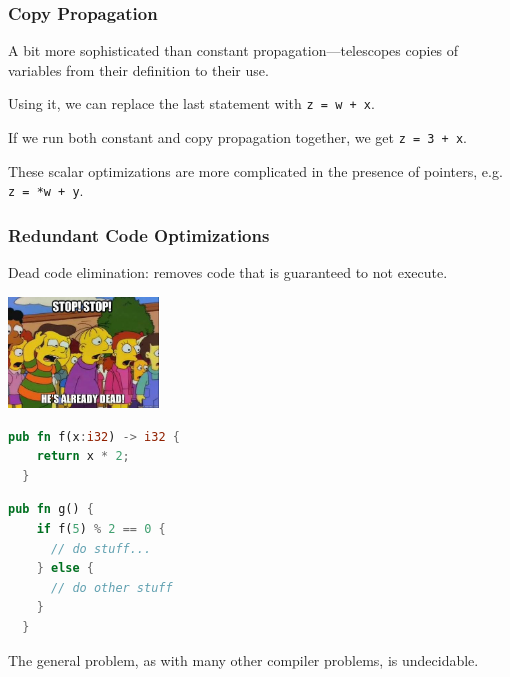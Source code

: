 \begin{frame}
\frametitle{Copy Propagation}

A bit more sophisticated than constant
propagation---telescopes copies of variables from their definition to
their use. 

Using it, we can replace the
last statement with {\tt z = w + x}. 

If we run both constant and copy
propagation together, we get {\tt z = 3 + x}.

These scalar optimizations are more complicated in the presence
of pointers, e.g. {\tt z = *w + y}.

\end{frame}


\begin{frame}[fragile]
\frametitle{Redundant Code Optimizations}

Dead code elimination: removes code that is guaranteed to not execute.

\begin{center}
	\includegraphics[width=0.3\textwidth]{images/alreadydead.jpg}
\end{center}

{\scriptsize
\begin{center}
\vspace*{-2em}
\begin{minipage}{.3\textwidth}
\begin{lstlisting}[language=Rust]
  pub fn f(x:i32) -> i32 {
    return x * 2;
  }
  \end{lstlisting}
  \end{minipage} \begin{minipage}{.3\textwidth}
\begin{lstlisting}[language=Rust]
  pub fn g() {
    if f(5) % 2 == 0 {
      // do stuff...
    } else {
      // do other stuff
    }
  }
\end{lstlisting}
\end{minipage}
\end{center}
}

The general problem, as with many other compiler problems, is undecidable.


\end{frame}


